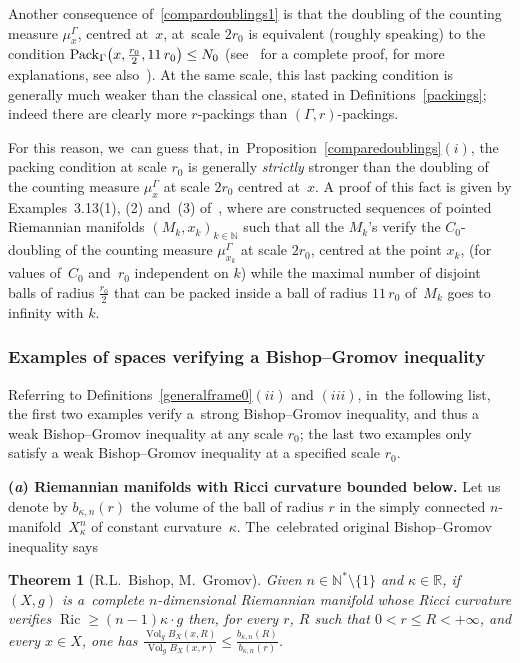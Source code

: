 \documentclass[pdftex]{sigma}
\numberwithin{equation}{section}
\newtheorem{theor}{Theorem}[section]
\newcommand{\N}{\mathbb{N}}
\newcommand{\R}{\mathbb{R}}
\newcommand{\Vol}{\operatorname{Vol}}
\newcommand{\Ric}{\operatorname{Ric}}
\begin{document}
Another consequence of~\eqref{compardoublings1} is that the doubling of the counting measure $\mu_{x}^{\Gamma} $, centred at~$x$, at~scale $2 r_0$
is equivalent (roughly speaking) to the condition ${\rm Pack}_\Gamma \big(x, \frac{r_0}{2}, 11\, r_0\big) \le N_0$ (see~\cite[Lemma~3.11]{BCGS} for a complete proof, for more explanations,
see also~\cite[Lemmas 3.14 and 3.15]{BCGS}). At the same scale, this last
packing condition is generally much weaker than the
classical one, stated in Definitions~\ref{packings}; indeed there are clearly more $r$-packings than $(\Gamma,r)$-packings.

For this reason, we~can guess that, in~Proposition~\ref{comparedoublings}$(i)$, the packing condition at scale $r_0$ is generally \textit{strictly} stronger than the doubling of the counting measure $\mu_{x}^{\Gamma}$ at scale $2 r_0$ centred at~$x$. A proof of this fact is given by Examples~3.13(1), (2) and~(3) of~\cite{BCGS}, where are constructed sequences of pointed Riemannian manifolds $(M_k, x_k)_{k \in \N}$ such that all the $M_k$'s verify the $C_0$-doubling of the counting measure $\mu_{x_k}^{\Gamma}$ at scale $2 r_0$, centred at the point $x_k$, (for values of~$C_0$ and~$r_0$ independent on $k$) while the maximal number of disjoint balls of
radius $ \frac{r_0}{2}$ that can be packed inside a ball of radius $11\, r_0$ of~$M_k$ goes to infinity with $k$.

\subsubsection{Examples of spaces verifying a Bishop--Gromov inequality}\label{BGexemples}

Referring to Definitions~\ref{generalframe0}$(ii)$ and $(iii)$, in~the following list, the first two examples verify a~strong Bishop--Gromov inequality,
and thus a weak Bishop--Gromov inequality at any scale $r_0$; the last two
examples only satisfy a weak Bishop--Gromov inequality at a specified scale $r_0$.

\medskip\noindent
{\bf (\emph{a}) Riemannian manifolds with Ricci curvature bounded below.}
Let us denote by $b_{\kappa, n} (r)$ the volume of the ball of radius $r$ in the simply connected $n$-manifold~$X_{\kappa}^n$ of constant curvature~$\kappa$. The~celebrated original Bishop--Gromov inequality says

\begin{theor}[R.L.~Bishop, M.~Gromov]\label{BishopGromov}
Given $n \in \N^* \setminus \{1\}$ and $\kappa \in \R$, if $(X,g)$ is a~complete $n$-dimensional Riemannian manifold whose Ricci curvature verifies $\Ric \ge (n-1) \kappa \cdot g $ then, for every $r$, $R$ such
that $0 < r \le R < +\infty$, and every $x \in X$, one has $\frac{\Vol_g
 B_X(x, R)}{\Vol_g B_X(x, r)} \le \frac{b_{\kappa, n} (R)}{b_{\kappa, n} ( r)}$.
\end{theor}
\end{document}
